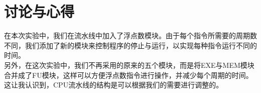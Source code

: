 \section{讨论与心得}
在本次实验中，我们在流水线中加入了浮点数模块。由于每个指令所需要的周期数不同，我们添加了新的模块来控制程序的停止与运行，以实现每种指令运行不同的时间。\\
另外，在这次实验中，我们不再采用的原来的五个模块，而是将EXE与MEM模块合并成了FU模块，这样可以方便浮点数指令进行操作，并减少每个周期的时间。这让我认识到，CPU流水线的结构是可以根据我们的需要进行调整的。